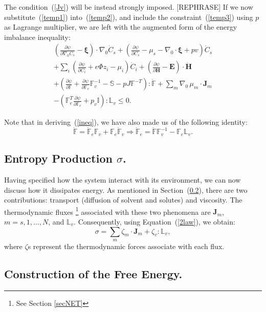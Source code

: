 \documentclass[runningheads]{llncs}
\newcommand{\F}{\ensuremath{\mathbb{F}}}
\newcommand{\LL}{\ensuremath{\mathbb{L}}}
\begin{document}
The condition~(\ref{Jv}) will be instead strongly imposed. [REPHRASE]
If we now substitute~(\ref{temp1}) into~(\ref{temp2}), and include the constraint~(\ref{temp3}) using $p$ as Lagrange multiplier, we are left with the augmented form of the energy imbalance inequality:
\begin{equation}
\begin{aligned}
\left(\frac{\partial \psi}{\partial \nabla_0 C_s}-\boldsymbol{\xi}\right) \cdot \nabla_0 \dot{C}_s + \left(\frac{\partial \psi}{\partial C_s}-\mu_s-\nabla_0 \cdot \boldsymbol{\xi}+p v\right)\dot{C}_s\\
+ \sum_i\left(\frac{\partial \psi}{\partial C_i} + e\Phi z_i-\mu_i\right) \dot{C}_i +\left(\frac{\partial \psi}{\partial \mathbf{H}}-\mathbf{E}\right) \cdot \dot{\mathbf{H}}\\
+ \left(\frac{\partial \psi}{\partial \F} + \frac{\partial \psi}{\partial\F_e}\F_v^{-1}- \mathbb{S} - p J \F^{-T}\right): \dot{\F}+ \sum_m \nabla_0 \,\mu_m \cdot \mathbf{J}_m \\
- \left(\F_e^T\frac{\partial \psi}{\partial \F_e}+p_v\mathbb{I}\right):\mathbb{L}_v\leq 0 . \label{ineq}
\end{aligned}
\end{equation}

Note that in deriving~(\ref{ineq}), we have also made us of the following identity:
\begin{equation}
\dot{\F}=\dot{\F}_e\F_v+\F_e\dot{\F}_v \Longrightarrow \dot{\F}_e=\dot{\F}\F_v^{-1}-\F_e \LL_v.
\end{equation}

\subsection{Entropy Production $\sigma$.}

Having specified how the system interact with its environment, we can now discuss how it dissipates energy. As mentioned in Section~(\ref{}), there are two contributions: transport (diffusion of solvent and solutes) and viscosity. The thermodynamic fluxes \footnote{See Section \ref{secNET}} associated with these two phenomena are $\mathbf{J}_m$, $m=s,1,\ldots,N$, and $\LL_v$. Consequently, using Equation~(\ref{2law}), we obtain:
\begin{equation}
\sigma = \sum_m \zeta_m \cdot \mathbf{J}_m + \zeta_v : \LL_v,
\end{equation}
where $\zeta$s represent the thermodynamic forces associate with each flux. 
\subsection{Construction of the Free Energy.}
\end{document}
